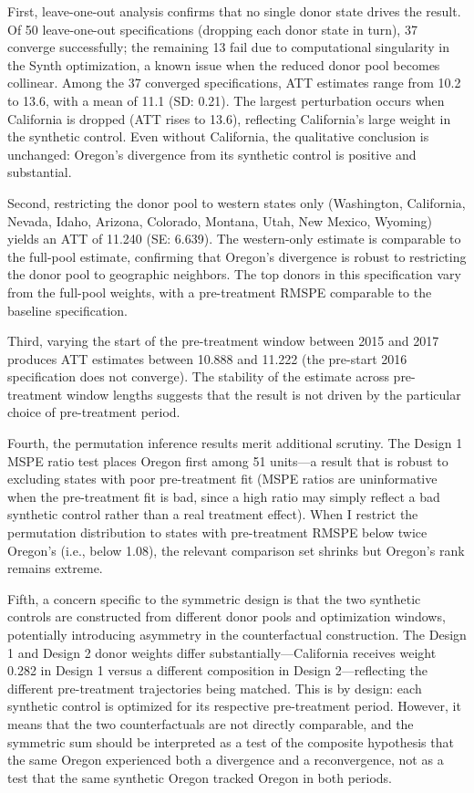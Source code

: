 \documentclass[12pt]{article}
\begin{document}
First, leave-one-out analysis confirms that no single donor state drives the result. Of 50 leave-one-out specifications (dropping each donor state in turn), 37 converge successfully; the remaining 13 fail due to computational singularity in the Synth optimization, a known issue when the reduced donor pool becomes collinear. Among the 37 converged specifications, ATT estimates range from 10.2 to 13.6, with a mean of 11.1 (SD: 0.21). The largest perturbation occurs when California is dropped (ATT rises to 13.6), reflecting California's large weight in the synthetic control. Even without California, the qualitative conclusion is unchanged: Oregon's divergence from its synthetic control is positive and substantial.

Second, restricting the donor pool to western states only (Washington, California, Nevada, Idaho, Arizona, Colorado, Montana, Utah, New Mexico, Wyoming) yields an ATT of 11.240 (SE: 6.639). The western-only estimate is comparable to the full-pool estimate, confirming that Oregon's divergence is robust to restricting the donor pool to geographic neighbors. The top donors in this specification vary from the full-pool weights, with a pre-treatment RMSPE comparable to the baseline specification.

Third, varying the start of the pre-treatment window between 2015 and 2017 produces ATT estimates between 10.888 and 11.222 (the pre-start 2016 specification does not converge). The stability of the estimate across pre-treatment window lengths suggests that the result is not driven by the particular choice of pre-treatment period.

Fourth, the permutation inference results merit additional scrutiny. The Design 1 MSPE ratio test places Oregon first among 51 units---a result that is robust to excluding states with poor pre-treatment fit (MSPE ratios are uninformative when the pre-treatment fit is bad, since a high ratio may simply reflect a bad synthetic control rather than a real treatment effect). When I restrict the permutation distribution to states with pre-treatment RMSPE below twice Oregon's (i.e., below 1.08), the relevant comparison set shrinks but Oregon's rank remains extreme.

Fifth, a concern specific to the symmetric design is that the two synthetic controls are constructed from different donor pools and optimization windows, potentially introducing asymmetry in the counterfactual construction. The Design 1 and Design 2 donor weights differ substantially---California receives weight 0.282 in Design 1 versus a different composition in Design 2---reflecting the different pre-treatment trajectories being matched. This is by design: each synthetic control is optimized for its respective pre-treatment period. However, it means that the two counterfactuals are not directly comparable, and the symmetric sum should be interpreted as a test of the composite hypothesis that the same Oregon experienced both a divergence and a reconvergence, not as a test that the same synthetic Oregon tracked Oregon in both periods.
\end{document}
